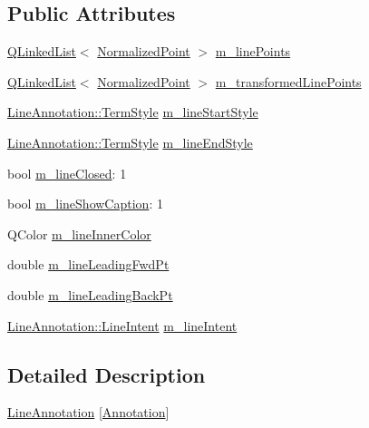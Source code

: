 \subsection*{Public Attributes}
\begin{DoxyCompactItemize}
\item 
\hyperlink{classQLinkedList}{Q\+Linked\+List}$<$ \hyperlink{classOkular_1_1NormalizedPoint}{Normalized\+Point} $>$ \hyperlink{classOkular_1_1LineAnnotationPrivate_ad1c827db72218f6c718da80220e4a7f7}{m\+\_\+line\+Points}
\item 
\hyperlink{classQLinkedList}{Q\+Linked\+List}$<$ \hyperlink{classOkular_1_1NormalizedPoint}{Normalized\+Point} $>$ \hyperlink{classOkular_1_1LineAnnotationPrivate_a68a2ec899127d3f2d1f0c69da619b1c3}{m\+\_\+transformed\+Line\+Points}
\item 
\hyperlink{classOkular_1_1LineAnnotation_a67e1128311347eabfd909909facabec6}{Line\+Annotation\+::\+Term\+Style} \hyperlink{classOkular_1_1LineAnnotationPrivate_aabf0926a14575248365c4e5de9d11296}{m\+\_\+line\+Start\+Style}
\item 
\hyperlink{classOkular_1_1LineAnnotation_a67e1128311347eabfd909909facabec6}{Line\+Annotation\+::\+Term\+Style} \hyperlink{classOkular_1_1LineAnnotationPrivate_a863fad380ea94af5d61687b7afb9ef4c}{m\+\_\+line\+End\+Style}
\item 
bool \hyperlink{classOkular_1_1LineAnnotationPrivate_a907d7a68ff88495dd5d318de5fdf53f3}{m\+\_\+line\+Closed}\+: 1
\item 
bool \hyperlink{classOkular_1_1LineAnnotationPrivate_a1260f459bf184a0606df9fa329406c21}{m\+\_\+line\+Show\+Caption}\+: 1
\item 
Q\+Color \hyperlink{classOkular_1_1LineAnnotationPrivate_a8000d981312a77260058c7bab0523dd0}{m\+\_\+line\+Inner\+Color}
\item 
double \hyperlink{classOkular_1_1LineAnnotationPrivate_affc0c88c47cf398b4cb52e94cae615ff}{m\+\_\+line\+Leading\+Fwd\+Pt}
\item 
double \hyperlink{classOkular_1_1LineAnnotationPrivate_a98ba85c09e6201d9df8da64c918c6a49}{m\+\_\+line\+Leading\+Back\+Pt}
\item 
\hyperlink{classOkular_1_1LineAnnotation_a80458e2d982d5ef91ff18b850b34489f}{Line\+Annotation\+::\+Line\+Intent} \hyperlink{classOkular_1_1LineAnnotationPrivate_a491ace64fcaa9d2156e541d75fc05431}{m\+\_\+line\+Intent}
\end{DoxyCompactItemize}


\subsection{Detailed Description}
\hyperlink{classOkular_1_1LineAnnotation}{Line\+Annotation} \mbox{[}\hyperlink{classOkular_1_1Annotation}{Annotation}\mbox{]} 

